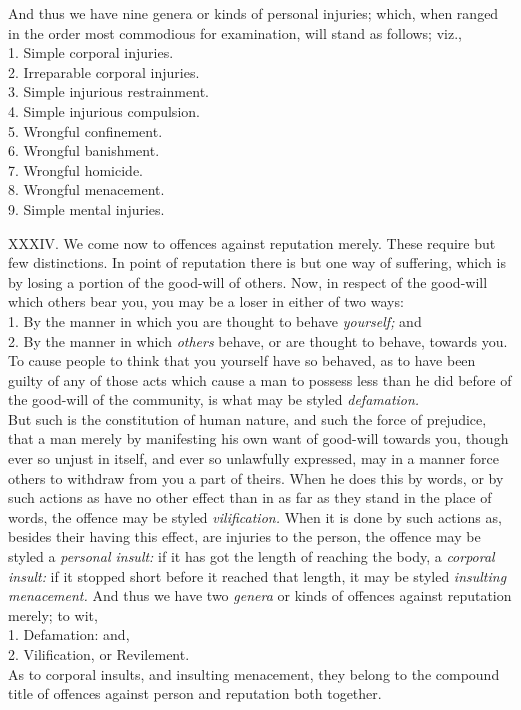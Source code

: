 \documentclass[12pt]{report}
\begin{document}
And thus we have nine genera or kinds of personal injuries; which, when
ranged in the order most commodious for examination, will stand as
follows; viz.,\\
1. Simple corporal injuries.\\
2. Irreparable corporal injuries.\\
3. Simple injurious restrainment.\\
4. Simple injurious compulsion.\\
5. Wrongful confinement.\\
6. Wrongful banishment.\\
7. Wrongful homicide.\\
8. Wrongful menacement.\\
9. Simple mental injuries.

XXXIV. We come now to offences against reputation merely. These require
but few distinctions. In point of reputation there is but one way of
suffering, which is by losing a portion of the good-will of others. Now,
in respect of the good-will which others bear you, you may be a loser in
either of two ways:\\
1. By the manner in which you are thought to behave \emph{yourself;}
and\\
2. By the manner in which \emph{others} behave, or are thought to
behave, towards you.\\
To cause people to think that you yourself have so behaved, as to have
been guilty of any of those acts which cause a man to possess less than
he did before of the good-will of the community, is what may be styled
\emph{defamation.}\\
But such is the constitution of human nature, and such the force of
prejudice, that a man merely by manifesting his own want of good-will
towards you, though ever so unjust in itself, and ever so unlawfully
expressed, may in a manner force others to withdraw from you a part of
theirs. When he does this by words, or by such actions as have no other
effect than in as far as they stand in the place of words, the offence
may be styled \emph{vilification.} When it is done by such actions as,
besides their having this effect, are injuries to the person, the
offence may be styled a \emph{personal insult:} if it has got the length
of reaching the body, a \emph{corporal insult:} if it stopped short
before it reached that length, it may be styled \emph{insulting
menacement.} And thus we have two \emph{genera} or kinds of offences
against reputation merely; to wit,\\
1. Defamation: and,\\
2. Vilification, or Revilement.\\
As to corporal insults, and insulting menacement, they belong to the
compound title of offences against person and reputation both together.
\end{document}
